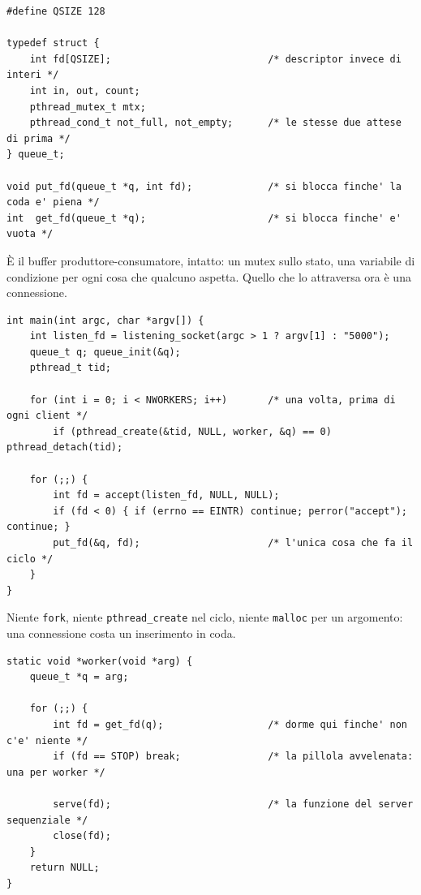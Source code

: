 \begin{lstlisting}[language={[POSIX]C}, style=wnumbers, title={La coda è il buffer limitato, con dentro descriptor}]
#define QSIZE 128

typedef struct {
    int fd[QSIZE];                           /* descriptor invece di interi */
    int in, out, count;
    pthread_mutex_t mtx;
    pthread_cond_t not_full, not_empty;      /* le stesse due attese di prima */
} queue_t;

void put_fd(queue_t *q, int fd);             /* si blocca finche' la coda e' piena */
int  get_fd(queue_t *q);                     /* si blocca finche' e' vuota */
\end{lstlisting}

È il buffer produttore-consumatore, intatto: un mutex sullo stato, una variabile di condizione per ogni cosa che qualcuno
aspetta. Quello che lo attraversa ora è una connessione.

\begin{lstlisting}[language={[POSIX]C}, style=wnumbers, title={Il ciclo di accept è il produttore}]
int main(int argc, char *argv[]) {
    int listen_fd = listening_socket(argc > 1 ? argv[1] : "5000");
    queue_t q; queue_init(&q);
    pthread_t tid;

    for (int i = 0; i < NWORKERS; i++)       /* una volta, prima di ogni client */
        if (pthread_create(&tid, NULL, worker, &q) == 0) pthread_detach(tid);

    for (;;) {
        int fd = accept(listen_fd, NULL, NULL);
        if (fd < 0) { if (errno == EINTR) continue; perror("accept"); continue; }
        put_fd(&q, fd);                      /* l'unica cosa che fa il ciclo */
    }
}
\end{lstlisting}

Niente \texttt{fork}, niente \texttt{pthread\_create} nel ciclo, niente \texttt{malloc} per un argomento: una connessione
costa un inserimento in coda.

\begin{lstlisting}[language={[POSIX]C}, style=wnumbers, title={Il worker è il consumatore}]
static void *worker(void *arg) {
    queue_t *q = arg;

    for (;;) {
        int fd = get_fd(q);                  /* dorme qui finche' non c'e' niente */
        if (fd == STOP) break;               /* la pillola avvelenata: una per worker */

        serve(fd);                           /* la funzione del server sequenziale */
        close(fd);
    }
    return NULL;
}
\end{lstlisting}

